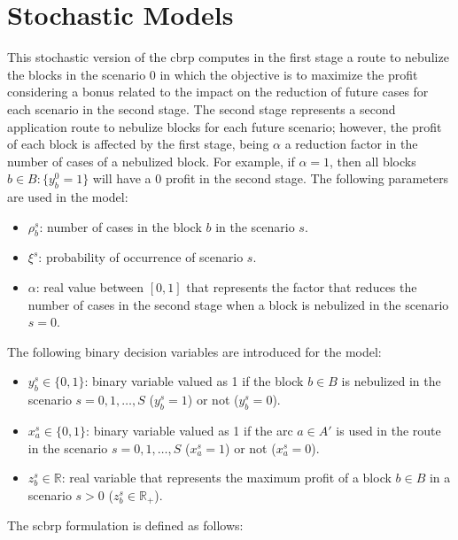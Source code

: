 \section{Stochastic Models}\label{sec:cbrp-stochastic-models}

This stochastic version of the \gls{cbrp} computes in the
first stage a route to nebulize the blocks in the scenario $0$ in which the
objective is to maximize the profit considering a bonus related to the impact on
the reduction of future cases for each scenario in the second stage. The second
stage represents a second application route to nebulize blocks for each future scenario;
however, the profit of each block is affected by the first stage, being $\alpha$
a reduction factor in the number of cases of a nebulized block. For example, if
$\alpha = 1$, then all blocks $b \in B: \{y_{b}^{0} = 1\}$ will have a $0$
profit in the second stage. The following parameters are used in the model:

\begin{itemize}
	\item $\rho_{b}^{s}$: number of cases in the block $b$ in the scenario $s$.
	\item $\xi^{s}$: probability of occurrence of scenario $s$.
	\item $\alpha$: real value between $[0, 1]$ that represents the factor that
	      reduces the number of cases in the second stage when a block is nebulized in
	      the scenario $s = 0$.
\end{itemize}

The following binary decision variables are introduced for the model:

\begin{itemize}
	\item $y_{b}^{s} \in \{0, 1\}$: binary variable valued as 1 if the block $b \in B$ is nebulized in the scenario $s = {0, 1, \dots, S}$ ($y_{b}^{s} = 1$) or not ($y_{b}^{s} = 0$).
	\item $x_{a}^{s} \in \{0, 1\}$: binary variable valued as 1 if the arc $a \in A'$ is used in the route in the scenario $s = {0, 1, \dots, S}$ ($x_{a}^{s} = 1$) or not ($x_{a}^{s} = 0$).
	\item $z_{b}^{s} \in \mathbb{R}$: real variable that represents the maximum profit of a block $b \in B$ in a scenario $s > 0$ ($z_{b}^{s} \in \mathbb{R}_{+}$).
\end{itemize}

The \gls{scbrp} formulation is defined as follows:

